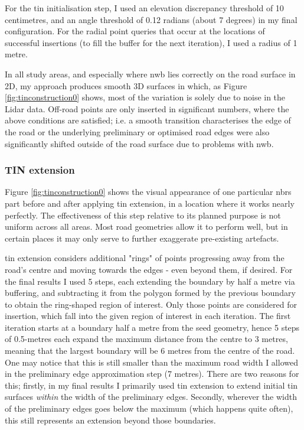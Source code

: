 For the \ac{tin} initialisation step, I used an elevation discrepancy threshold of 10 centimetres, and an angle threshold of 0.12 radians (about 7 degrees) in my final configuration. For the radial point queries that occur at the locations of successful insertions (to fill the buffer for the next iteration), I used a radius of 1 metre.

In all study areas, and especially where \ac{nwb} lies correctly on the road surface in 2D, my approach produces smooth 3D surfaces in which, as Figure \ref{fig:tinconstruction0} shows, most of the variation is solely due to noise in the Lidar data. Off-road points are only inserted in significant numbers, where the above conditions are satisfied; i.e. a smooth transition characterises the edge of the road or the underlying preliminary or optimised road edges were also significantly shifted outside of the road surface due to problems with \ac{nwb}.

\subsubsection{TIN extension}

Figure \ref{fig:tinconstruction0} shows the visual appearance of one particular \ac{nbrs} part before and after applying \ac{tin} extension, in a location where it works nearly perfectly. The effectiveness of this step relative to its planned purpose is not uniform across all areas. Most road geometries allow it to perform well, but in certain places it may only serve to further exaggerate pre-existing artefacts.

\ac{tin} extension considers additional "rings" of points progressing away from the road's centre and moving towards the edges - even beyond them, if desired. For the final results I used 5 steps, each extending the boundary by half a metre via buffering, and subtracting it from the polygon formed by the previous boundary to obtain the ring-shaped region of interest. Only those points are considered for insertion, which fall into the given region of interest in each iteration. The first iteration starts at a boundary half a metre from the seed geometry, hence 5 steps of 0.5-metres each expand the maximum distance from the centre to 3 metres, meaning that the largest boundary will be 6 metres from the centre of the road. One may notice that this is still smaller than the maximum road width I allowed in the preliminary edge approximation step (7 metres). There are two reasons for this; firstly, in my final results I primarily used \ac{tin} extension to extend initial \ac{tin} surfaces \textit{within} the width of the preliminary edges. Secondly, wherever the width of the preliminary edges goes below the maximum (which happens quite often), this still represents an extension beyond those boundaries.

